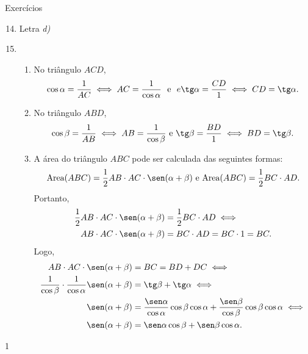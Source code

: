 \begin{answer}{Exercícios}
{\exerciselist
\begin{enumerate}[wide]\setcounter{enumi}{13}
\item Letra \textit{d)}
\item 
\begin{enumerate}[wide]
    \item{}
    No triângulo $ACD$, 
    $$\cos\alpha=\frac{1}{AC} \iff AC=\frac{1}{\cos\alpha} \ \ \text{e}\ \  e \tg\alpha=\frac{CD}{1} \iff CD=\tg\alpha.$$

    \item{}
     No triângulo $ABD$, 
     $$\cos\beta=\frac{1}{AB} \iff AB=\frac{1}{\cos\beta} \ \text{e} \ \tg\beta=\frac{BD}{1} \iff BD=\tg\beta.$$
     
     \item{} 
     A área do triângulo $ABC$ pode ser calculada das seguintes formas:
     $$\text{Area}(ABC)=\frac{1}{2}AB\cdot AC\cdot\sen(\alpha+\beta) \ \text{e} \ \text{Area}(ABC)=\frac{1}{2}BC\cdot AD.$$
     Portanto,
    \begin{align*}
         \frac{1}{2}AB\cdot AC\cdot\sen(\alpha+\beta)&=\frac{1}{2}BC\cdot AD \iff\\
         AB\cdot AC \cdot \sen(\alpha+\beta)&=BC\cdot AD=BC \cdot 1=BC.
    \end{align*}     
     Logo,
    \begin{align*}
         AB\cdot AC \cdot \sen(\alpha+\beta)&=BC=BD+DC \iff\\
         \frac{1}{\cos\beta}\cdot\frac{1}{\cos\alpha}\sen(\alpha+\beta)&=\tg\beta+\tg\alpha \iff\\
         \sen(\alpha+\beta)&=\frac{\sen\alpha}{\cos\alpha}\cos\beta\cos\alpha+\frac{\sen\beta}{\cos\beta}\cos\beta\cos\alpha \iff\\
         \sen(\alpha+\beta)&=\sen\alpha\cos\beta+\sen\beta\cos\alpha.
    \end{align*}
\end{enumerate}
\end{enumerate}
}{1}
\end{answer}
\clearmargin
